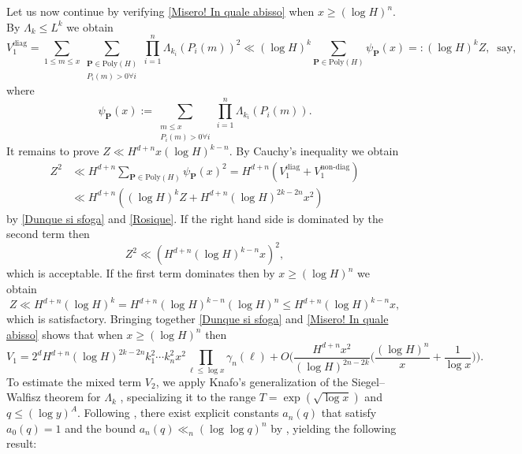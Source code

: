 \documentclass[reqno, 11pt]{amsart}
\numberwithin{equation}{section}
\theoremstyle{definition}
\newcommand{\0}{\mathbf{0}}
\renewcommand{\leq}{\leqslant}
\renewcommand{\geq}{\geqslant}
\renewcommand{\P}{\mathbb{P}}
\renewcommand{\leq}{\leqslant}
\renewcommand{\geq}{\geqslant}
\renewcommand{\#}{\sharp}
\begin{document}
Let us now continue by verifying \eqref{Misero! In quale abisso} when $x\geq (\log H)^n$. By $\Lambda_k \leq L^k$ we obtain  
\begin{equation} \label{Rosique}  V_1^{\textrm{diag}} =  \sum_{1\leq m\leq x }  \sum_{\substack{\mathbf P \in  \textrm{Poly}(H)\\P_i(m)>0\forall i }}  \prod_{i=1}^n \Lambda_{k_i}(P_i(m))^2 \ll   (\log H)^{k}  \sum_{\mathbf P \in  \textrm{Poly}(H)} 
\psi_{\mathbf P}(x)=: (\log H)^{k}  Z, \ \textrm{ say},\end{equation} where  $$\psi_{\mathbf P}(x):=
 \sum_{\substack{m\leq x\\P_i(m)>0\forall i }}   \prod_{i=1}^n \Lambda_{k_i}(P_i(m)).$$ It remains to prove 
 $Z\ll H^{d+n} x(\log H)^{k-n}$. By Cauchy's inequality we obtain  \begin{align*} Z^2   &\ll  H^{d+n} 
 \sum_{\mathbf P \in  \textrm{Poly}(H)}  \psi_{\mathbf P }(x)^2 =H^{d+n} (V_1^{\textrm{diag}}+V_1^{\textrm{non-diag}})\\
&\ll   H^{d+n}  ( (\log H)^k Z + H^{d+n}  (\log H)^{2k-2n}  x^2) \end{align*} by \eqref{Dunque si sfoga} and \eqref{Rosique}.
 If the  right hand side  is dominated   by the second term  then   $$ Z^2 \ll  (H^{d+n}  (\log H)^{k-n}  x)^2,$$ which is acceptable. 
If the first term dominates then  by $x\geq (\log H)^n$ we obtain   $$ Z \ll  H^{d+n}   (\log H)^{k}  = H^{d+n}   (\log H)^{k- n}
(\log H)^n \leq H^{d+n}   (\log H)^{k- n} x,$$ which is satisfactory. Bringing together   \eqref{Dunque si sfoga} and \eqref{Misero! In quale abisso} shows that when $x\geq (\log H)^n$ then   \begin{equation}\label{finalv1} V_1= 2^d H^{d+n}  (\log H)^{2k-2n} k_1^2\cdots k_n^2 x^2 \prod_{ \ell \leq \log x}  \gamma_n(\ell)  +O\Big( \frac{ H^{d+n} x^2}{ (\log H)^{2n-2k} } \Big( \frac{(\log H)^n}{x}
+ \frac{1}{\log x} \Big) \Big).\end{equation} To estimate the mixed term $V_2$, we apply  Knafo's generalization of the Siegel--Walfisz theorem for  $\Lambda_k$ \cite[Theorem 5]{knafo}, specializing it to the  range $T =\exp(\sqrt{ \log x})$ and $q \leq (\log y)^A$. Following  \cite[Definition 1, p. 332]{knafo}, there exist explicit constants $a_n(q)$ that satisfy $a_0(q)=1$ and 
the bound $a_n(q)\ll_n (\log \log q)^n $ by  \cite[Lemma 2]{knafo}, yielding the following result:
\end{document}

